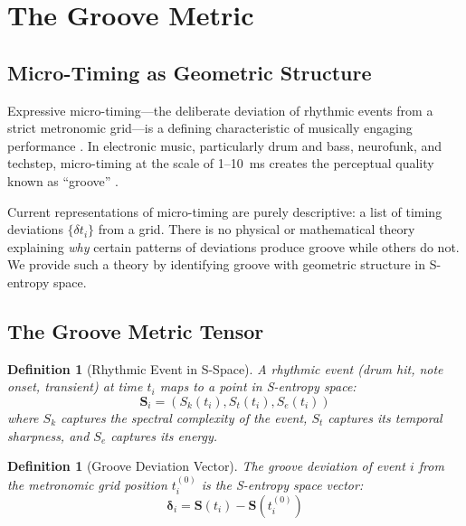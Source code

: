 \documentclass[twocolumn,10pt]{article}
\newtheorem{definition}[theorem]{Definition}
\theoremstyle{remark}
\newcommand{\Sk}{S_k}
\newcommand{\St}{S_t}
\newcommand{\Se}{S_e}
\begin{document}
\section{The Groove Metric}
\label{sec:groove}

\subsection{Micro-Timing as Geometric Structure}

Expressive micro-timing---the deliberate deviation of rhythmic events from a strict metronomic grid---is a defining characteristic of musically engaging performance \cite{bilmes1993, friberg2002, iyer2002, honing2012}. In electronic music, particularly drum and bass, neurofunk, and techstep, micro-timing at the scale of 1--10~ms creates the perceptual quality known as ``groove'' \cite{madison2011, butterfield2010, danielsen2010}.

Current representations of micro-timing are purely descriptive: a list of timing deviations $\{\delta t_i\}$ from a grid. There is no physical or mathematical theory explaining \textit{why} certain patterns of deviations produce groove while others do not. We provide such a theory by identifying groove with geometric structure in S-entropy space.

\subsection{The Groove Metric Tensor}

\begin{definition}[Rhythmic Event in S-Space]
\label{def:rhythmic_event}
A rhythmic event (drum hit, note onset, transient) at time $t_i$ maps to a point in S-entropy space:
\begin{equation}
    \mathbf{S}_i = (\Sk(t_i), \St(t_i), \Se(t_i))
    \label{eq:s_event}
\end{equation}
where $\Sk$ captures the spectral complexity of the event, $\St$ captures its temporal sharpness, and $\Se$ captures its energy.
\end{definition}

\begin{definition}[Groove Deviation Vector]
\label{def:groove_deviation}
The groove deviation of event $i$ from the metronomic grid position $t_i^{(0)}$ is the S-entropy space vector:
\begin{equation}
    \boldsymbol{\delta}_i = \mathbf{S}(t_i) - \mathbf{S}(t_i^{(0)})
    \label{eq:groove_deviation}
\end{equation}
\end{definition}
\end{document}
